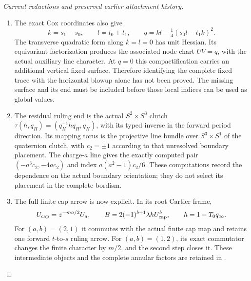 \begin{proof}[Current reductions and preserved earlier attachment history]
\begin{enumerate}[label=\arabic*.]
\item The exact Cox coordinates also give
\[
 k=s_1-s_0,\qquad l=t_0+t_1,\qquad
 q=kl-\tfrac14(s_0l-t_1k)^2.
\]
The transverse quadratic form along \(k=l=0\) has unit
Hessian. Its equivariant factorization produces the associated
node chart \(UV=q\), with the actual auxiliary line character.
At \(q=0\) this compactification carries an additional
vertical fixed surface. Therefore identifying the complete
fixed trace with the horizontal blowup alone has not been
proved. The missing surface and its end must be included
before those local indices can be used as global values.

\item The residual ruling end is the actual
\(S^2\times S^3\) clutch
\(\tau(h,q_H)=(q_H^{-1}h q_H,q_H)\), with its typed inverse
in the forward period direction. Its mapping torus is the
projective line bundle over \(S^3\times S^1\) of the
quaternion clutch, with \(c_2=\pm1\) according to that
unresolved boundary placement. The charge-\(a\) line gives
the exactly computed pair \((-a^3c_2,-4ac_2)\) and index
\(a(a^2-1)c_2/6\). These computations record the dependence
on the actual boundary orientation; they do not select its
placement in the complete bordism.

\item The full finite cap arrow is now explicit. In its root
Cartier frame,
\[
 U_{\rm cap}=z^{-ma/2}U_a,\qquad
 B=2(-1)^{b+1}\lambda h U_{\rm cap}^{b},\qquad
 h=1-T_0q_\infty.
\]
For \((a,b)=(2,1)\) it commutes with the actual finite cap
map and retains one forward \(t\)-to-\(s\) ruling arrow.
For \((a,b)=(1,2)\), its exact commutator changes the finite
character by \(m/2\), and the second step closes it. These
intermediate objects and the complete annular factors are
retained in
.


\end{enumerate}
\end{proof}
